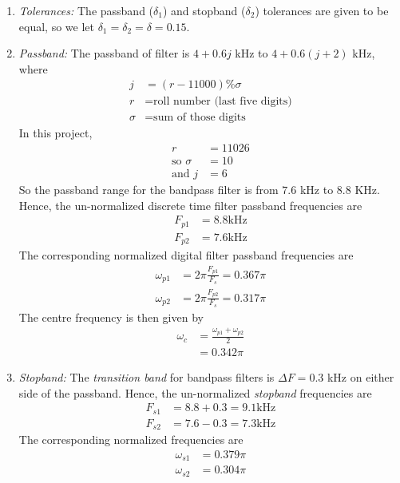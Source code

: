\documentclass{article}
\begin{document}
\begin{enumerate}
\item {\em Tolerances:}  The passband ($\delta_1$) and stopband ($\delta_2$) tolerances are given to
be equal, so we let $\delta_1 = \delta_2 = \delta = 0.15$.
\item {\em Passband:}  The passband of filter is $4+0.6j$ kHz to $4+0.6(j+2)$ kHz, where 
\begin{align}
    j &= (r-11000)\%\sigma \\
    r &= \text{roll number (last five digits)} \\
    \sigma &= \text{sum of those digits}
\end{align}
In this project,
\begin{align}
    r &= 11026 \\
 \text{so }   \sigma &= 10 \\
  \text{and }  j &=6
\end{align}
So the passband range for the bandpass filter is from $7.6$ kHz to $8.8$ KHz. Hence, the un-normalized discrete time filter passband frequencies are 
\begin{align}
    F_{p1} &= 8.8 \text{kHz} \\
    F_{p2} &= 7.6 \text{kHz}
\end{align}
The corresponding normalized digital filter passband frequencies are 
\begin{align}
    \omega_{p1} &= 2\pi\frac{F_{p1}}{F_s}  = 0.367\pi \\
    \omega_{p2} &= 2\pi\frac{F_{p2}}{F_s}  = 0.317 \pi
\end{align}
The centre frequency is then given by  
\begin{align}
    \omega_c &= \frac{\omega_{p1} + \omega_{p2}}{2} \\
             &= 0.342\pi
\end{align}
\item {\em Stopband:}  The {\em transition band} for bandpass filters is $\Delta F = 0.3$ kHz on either side of the passband.
Hence, the un-normalized {\em stopband} frequencies are 
\begin{align}
    F_{s1} &= 8.8 + 0.3 = 9.1 \text{kHz} \\
    F_{s2} &= 7.6 - 0.3 = 7.3 \text{kHz}
\end{align}
The corresponding normalized frequencies are 
\begin{align}
    \omega_{s1} &= 0.379 \pi \\
    \omega_{s2} &=  0.304 \pi
\end{align}
\end{enumerate}
\end{document}
